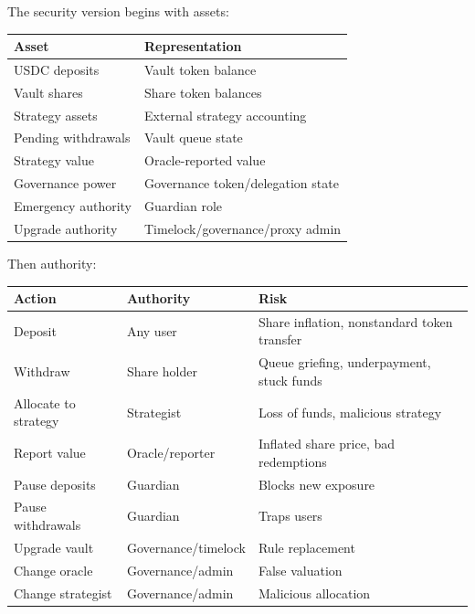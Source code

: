 The security version begins with assets:

{\def\LTcaptype{none} %
\begin{longtable}[]{@{}ll@{}}
\toprule\noalign{}
Asset & Representation \\
\midrule\noalign{}
\endhead
\bottomrule\noalign{}
\endlastfoot
USDC deposits & Vault token balance \\
Vault shares & Share token balances \\
Strategy assets & External strategy accounting \\
Pending withdrawals & Vault queue state \\
Strategy value & Oracle-reported value \\
Governance power & Governance token/delegation state \\
Emergency authority & Guardian role \\
Upgrade authority & Timelock/governance/proxy admin \\
\end{longtable}
}

Then authority:

{\def\LTcaptype{none} %
\begin{longtable}[]{@{}
  >{\raggedright\arraybackslash}p{}
  >{\raggedright\arraybackslash}p{}
  >{\raggedright\arraybackslash}p{}@{}}
\toprule\noalign{}
\begin{minipage}[b]{\linewidth}\raggedright
Action
\end{minipage} & \begin{minipage}[b]{\linewidth}\raggedright
Authority
\end{minipage} & \begin{minipage}[b]{\linewidth}\raggedright
Risk
\end{minipage} \\
\midrule\noalign{}
\endhead
\bottomrule\noalign{}
\endlastfoot
Deposit & Any user & Share inflation, nonstandard token transfer \\
Withdraw & Share holder & Queue griefing, underpayment, stuck funds \\
Allocate to strategy & Strategist & Loss of funds, malicious strategy \\
Report value & Oracle/reporter & Inflated share price, bad
redemptions \\
Pause deposits & Guardian & Blocks new exposure \\
Pause withdrawals & Guardian & Traps users \\
Upgrade vault & Governance/timelock & Rule replacement \\
Change oracle & Governance/admin & False valuation \\
Change strategist & Governance/admin & Malicious allocation \\
\end{longtable}
}


